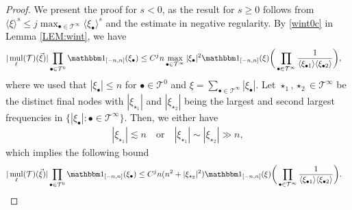 \documentclass[a4paper,
11pt,  reqno]{amsart}
\newcommand{\5}{\textup{V}}
\newcommand{\ind}{\mathbbm 1}
\newcommand{\les}{\lesssim}
\theoremstyle{remark}
\newcommand{\bul}{\bullet}
\newcommand{\TT}{\mathcal{T}}
\renewcommand{\l}{\ell}
\newcommand{\jb}[1]
{\langle #1 \rangle}
\DeclareMathOperator{\mul}{mul}
\numberwithin{equation}{section}
\numberwithin{theorem}{section}
\begin{document}
\begin{proof}
We present the proof for $s<0$, as the result for $s\ge 0$ follows from $\jb{\xi}^s \le j \max_{\bul\in \TT^\infty} \jb{\xi_\bul}^s$ and the estimate in negative regularity.
By \eqref{wint0c} in  Lemma \ref{LEM:wint}, we have
\begin{align*}
| \mul_\l (\TT) (\vec\xi) | \prod_{\bul\in \TT^0} \ind_{[-n,n]}(\xi_\bul)
&
\le C^j n \max_{\bul\in \TT^\infty} |\xi_\bul|^2 \ind_{[-n,n]}(\xi) \bigg( \prod_{\bul\in \TT^\infty} \frac{1}{\jb{\xi_{\bul1}} \jb{\xi_{\bul2}}} \bigg),
\end{align*}
where we used that $|\xi_\bul| \le n$ for $\bul\in\TT^0$ and $\xi = \sum_{\bul \in \TT^\infty} |\xi_\bul|$.
Let $\star_1, \star_2 \in \TT^\infty$ be the distinct final nodes with $|\xi_{\star_1}|$ and $|\xi_{\star_2}|$ being the largest and second largest frequencies in $\{ |\xi_{\bul}|: \bul \in \TT^\infty\}$. Then, we either have
\begin{align}
|\xi_{\star_1}| \les n
\quad
\text{or}
\quad
|\xi_{\star_1}| \sim |\xi_{\star_2}| \gg n,
\end{align}
which implies the following bound
\begin{align}\label{eq:est_mult_n}
| \mul_\l (\TT) (\vec\xi) | \prod_{\bul\in \TT^0} \ind_{[-n,n]}(\xi_\bul)
&
\le C^j n (n^2 + |\xi_{\star_2}|^2)  \ind_{[-n,n]}(\xi) \bigg( \prod_{\bul\in \TT^\infty} \frac{1}{\jb{\xi_{\bul1}} \jb{\xi_{\bul2}}} \bigg).
\end{align}


\end{proof}
\end{document}

